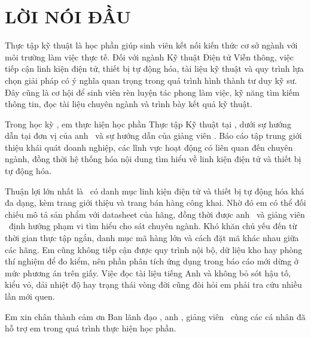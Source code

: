 \chapter*{LỜI NÓI ĐẦU}

Thực tập kỹ thuật là học phần giúp sinh viên kết nối kiến thức cơ sở ngành với
môi trường làm việc thực tế. Đối với ngành Kỹ thuật Điện tử Viễn thông, việc
tiếp cận linh kiện điện tử, thiết bị tự động hóa, tài liệu kỹ thuật và quy trình
lựa chọn giải pháp có ý nghĩa quan trọng trong quá trình hình thành tư duy kỹ
sư. Đây cũng là cơ hội để sinh viên rèn luyện tác phong làm việc, kỹ năng tìm
kiếm thông tin, đọc tài liệu chuyên ngành và trình bày kết quả kỹ thuật.

Trong học kỳ \Semester, em thực hiện học phần Thực tập Kỹ thuật tại
\CompanyName, dưới sự hướng dẫn tại đơn vị của anh \CompanySupervisor\ và sự
hướng dẫn của giảng viên \UniversitySupervisor. Báo cáo tập trung giới thiệu
khái quát doanh nghiệp, các lĩnh vực hoạt động có liên quan đến chuyên ngành,
đồng thời hệ thống hóa nội dung tìm hiểu về linh kiện điện tử và thiết bị tự
động hóa.

Thuận lợi lớn nhất là \CompanyName\ có danh mục linh kiện điện tử và thiết bị
tự động hóa khá đa dạng, kèm trang giới thiệu và trang bán hàng công khai. Nhờ
đó em có thể đối chiếu mô tả sản phẩm với datasheet của hãng, đồng thời được
anh \CompanySupervisor\ và giảng viên \UniversitySupervisor\ định hướng phạm vi
tìm hiểu cho sát chuyên ngành. Khó khăn chủ yếu đến từ thời gian thực tập
ngắn, danh mục mã hàng lớn và cách đặt mã khác nhau giữa các hãng. Em cũng
không tiếp cận được quy trình nội bộ, dữ liệu kho hay phòng thí nghiệm để đo
kiểm, nên phần phân tích ứng dụng trong báo cáo mới dừng ở mức phương án trên
giấy. Việc đọc tài liệu tiếng Anh và không bỏ sót hậu tố, kiểu vỏ, dải nhiệt độ
hay trạng thái vòng đời cũng đòi hỏi em phải tra cứu nhiều lần mới quen.


Em xin chân thành cảm ơn Ban lãnh đạo \CompanyName, anh \CompanySupervisor,
giảng viên \UniversitySupervisor\ cùng các cá nhân đã hỗ trợ em trong quá trình
thực hiện học phần.
